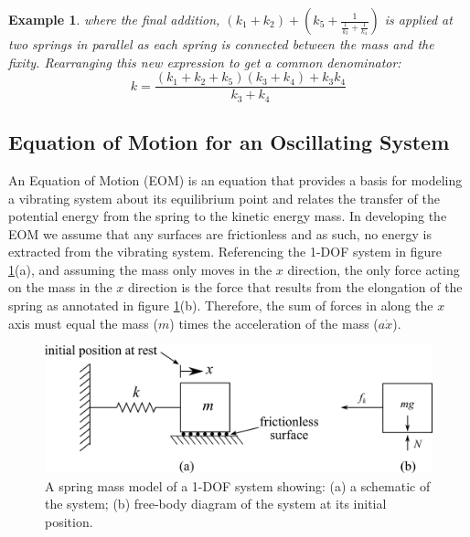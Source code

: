 \documentclass[12pt,letter]{article}
\newtheorem{ex}{Example}
\numberwithin{ex}{section} %
\newenvironment{example}{\begin{mdframed}[middlelinewidth=0.5mm]\begin{ex}\normalfont}{\end{ex}\end{mdframed}}
\numberwithin{re}{section} %
\begin{document}
\begin{example}
				\noindent where the final addition, $(k_1+k_2) + (k_5+\frac{1}{\frac{1}{k_3}+\frac{1}{k_4}})$ is applied at two springs in parallel as each spring is connected between the mass and the fixity. Rearranging this new expression to get a common denominator:
				\begin{equation}
					k= \frac{(k_1+k_2+k_5)(k_3+k_4)+k_3k_4}{k_3+k_4}  
				\end{equation}				
			\end{example}	

					
	\subsection{Equation of Motion for an Oscillating System}			
			
        An Equation of Motion (EOM) is an equation that provides a basis for modeling a vibrating system about its equilibrium point and relates the transfer of the potential energy from the spring to the kinetic energy mass. In developing the EOM we assume that any surfaces are frictionless and as such, no energy is extracted from the vibrating system. Referencing the 1-DOF system in figure \ref{fig:EOM_1-DOF-mass_horizontal}(a), and assuming the mass only moves in the $x$ direction, the only force acting on the mass in the $x$ direction is the force that results from the elongation of the spring as annotated in figure \ref{fig:EOM_1-DOF-mass_horizontal}(b). Therefore, the sum of forces in along the $x$ axis must equal the mass ($m$) times the acceleration of the mass ($a\dot{x}$). 

		\begin{figure}[H]
			\centering
			\includegraphics[]{../figures/EOM_1-DOF-mass_horizontal.png}
			\caption{A spring mass model of a 1-DOF system showing: (a) a schematic of the system; (b)  free-body diagram of the system at its initial position.}
			\label{fig:EOM_1-DOF-mass_horizontal}
		\end{figure}			
		
\end{document}
